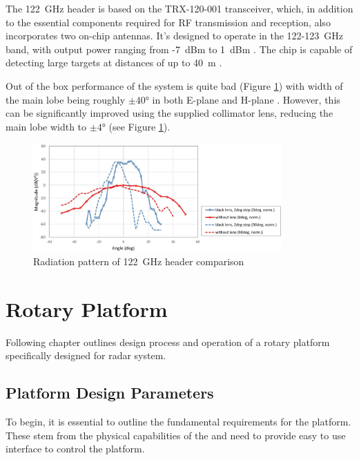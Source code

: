 The 122~GHz header is based on the TRX-120-001 transceiver, which, in addition to the essential components required for RF transmission and reception, also incorporates two on-chip antennas.
It's designed to operate in the 122-123~GHz band, with output power ranging from -7~dBm to 1~dBm \cite{sidarTRX122}.
The chip is capable of detecting large targets at distances of up to 40~m \cite{sidarMANOld}.

Out of the box performance of the system is quite bad (Figure \ref{fig:sidar122rad}) with width of the main lobe being roughly $\pm40\text{°}$ in both E-plane and H-plane \cite{sidarTRX122}.
However, this can be significantly improved using the supplied collimator lens, reducing the main lobe width to $\pm4\text{°}$ \cite{sidarTRX122col} (see Figure \ref{fig:sidar122rad}).


\begin{figure}[h!]
  \centering
  \includegraphics[width=0.85\textwidth]{../img/sidar122rad.jpg}
  \caption[Radiation pattern of 122~GHz header comparison \cite{sidarTRX122col}]{Radiation pattern of 122~GHz header comparison}
  \label{fig:sidar122rad}
\end{figure}



\chapter{Rotary Platform}

Following chapter outlines design process and operation of a rotary platform specifically designed for \sidar radar system.

\section{Platform Design Parameters}


To begin, it is essential to outline the fundamental requirements for the platform.
These stem from the physical capabilities of the \sidar and need to provide easy to use interface to control the platform.

